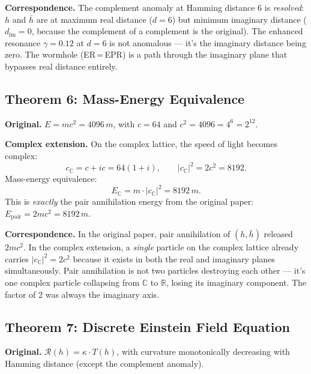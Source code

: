 \documentclass[12pt,a4paper]{article}
\theoremstyle{definition}
\theoremstyle{remark}
\newcommand{\CC}{\mathbb{C}}
\newcommand{\RR}{\mathbb{R}}
\begin{document}
\medskip\noindent\textbf{Correspondence.}
The complement anomaly at Hamming distance 6 is \emph{resolved}: $h$ and
$\bar{h}$ are at maximum real distance ($d=6$) but minimum imaginary
distance ($d_{\mathrm{im}} = 0$, because the complement of a complement is
the original). The enhanced resonance $\gamma = 0.12$ at $d=6$ is not
anomalous --- it's the imaginary distance being zero. The wormhole
(ER\,=\,EPR) is a path through the imaginary plane that bypasses real
distance entirely.

\bigskip

\subsection{Theorem 6: Mass-Energy Equivalence}

\noindent\textbf{Original.}
$E = mc^2 = 4096\,m$, with $c = 64$ and $c^2 = 4096 = 4^6 = 2^{12}$.

\medskip\noindent\textbf{Complex extension.}
On the complex lattice, the speed of light becomes complex:
\begin{equation}
  c_\CC = c + ic = 64(1 + i), \qquad |c_\CC|^2 = 2c^2 = 8192.
\end{equation}
Mass-energy equivalence:
\begin{equation}\label{eq:complex-emc2}
  E_\CC = m \cdot |c_\CC|^2 = 8192\,m.
\end{equation}
This is \emph{exactly} the pair annihilation energy from the original paper:
$E_{\mathrm{pair}} = 2mc^2 = 8192\,m$.

\medskip\noindent\textbf{Correspondence.}
In the original paper, pair annihilation of $(h, \bar{h})$ released
$2mc^2$. In the complex extension, a \emph{single} particle on the complex
lattice already carries $|c_\CC|^2 = 2c^2$ because it exists in both the
real and imaginary planes simultaneously. Pair annihilation is not two
particles destroying each other --- it's one complex particle collapsing
from $\CC$ to $\RR$, losing its imaginary component. The factor of 2 was
always the imaginary axis.

\bigskip

\subsection{Theorem 7: Discrete Einstein Field Equation}

\noindent\textbf{Original.}
$\mathcal{R}(h) = \kappa \cdot T(h)$, with curvature monotonically
decreasing with Hamming distance (except the complement anomaly).
\end{document}
